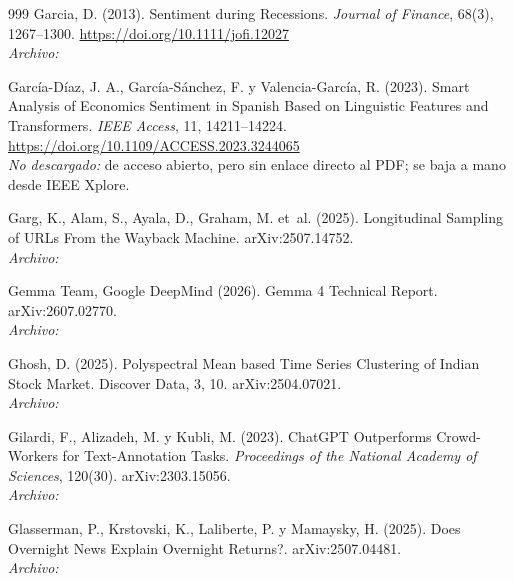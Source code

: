 \begin{thebibliography}{999}
Garcia, D. (2013). Sentiment during Recessions. \emph{Journal of Finance}, 68(3), 1267--1300. \url{https://doi.org/10.1111/jofi.12027}
\\\textit{Archivo:} 

Garc{\'i}a-D{\'i}az, J. A., Garc{\'i}a-S{\'a}nchez, F. y Valencia-Garc{\'i}a, R. (2023). Smart Analysis of Economics Sentiment in {Spanish} Based on Linguistic Features and Transformers. \emph{IEEE Access}, 11, 14211--14224. \url{https://doi.org/10.1109/ACCESS.2023.3244065}
\\\textit{No descargado:} de acceso abierto, pero sin enlace directo al PDF; se baja a mano desde IEEE Xplore.

Garg, K., Alam, S., Ayala, D., Graham, M. et~al. (2025). Longitudinal Sampling of {URLs} From the {Wayback Machine}. arXiv:2507.14752.
\\\textit{Archivo:} 

Gemma Team, Google DeepMind (2026). Gemma 4 Technical Report. arXiv:2607.02770.
\\\textit{Archivo:} 

Ghosh, D. (2025). Polyspectral Mean based Time Series Clustering of Indian Stock Market. Discover Data, 3, 10. arXiv:2504.07021.
\\\textit{Archivo:} 

Gilardi, F., Alizadeh, M. y Kubli, M. (2023). {ChatGPT} Outperforms Crowd-Workers for Text-Annotation Tasks. \emph{Proceedings of the National Academy of Sciences}, 120(30). arXiv:2303.15056.
\\\textit{Archivo:} 

Glasserman, P., Krstovski, K., Laliberte, P. y Mamaysky, H. (2025). Does Overnight News Explain Overnight Returns?. arXiv:2507.04481.
\\\textit{Archivo:} 


\end{thebibliography}
